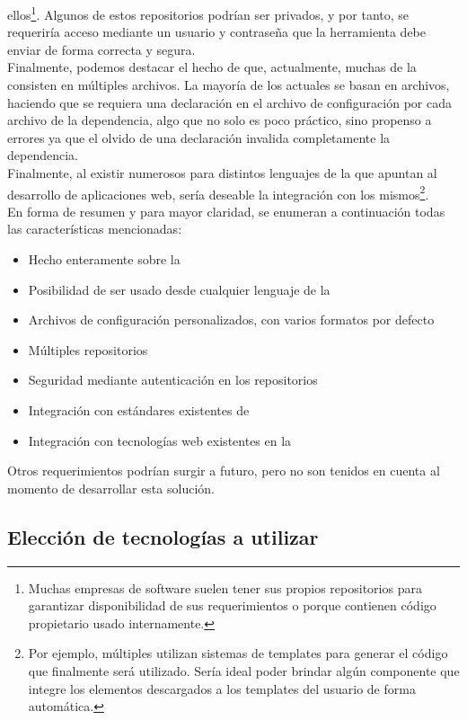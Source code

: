 ellos\footnote{
	Muchas empresas de software suelen tener sus propios repositorios para
	garantizar disponibilidad de sus requerimientos o porque contienen código
	propietario usado internamente.
}. Algunos de estos repositorios podrían ser privados, y por tanto, se requeriría
acceso mediante un usuario y contraseña que la herramienta debe enviar de forma
correcta y segura.\\
Finalmente, podemos destacar el hecho de que, actualmente, muchas \dependencies
de la \viewtier consisten en múltiples archivos. La mayoría de los \depmgrs actuales
se basan en archivos, haciendo que se requiera una declaración en el archivo de
configuración por cada archivo de la dependencia, algo que no solo es poco práctico,
sino propenso a errores ya que el olvido de una declaración invalida completamente
la dependencia.\\
Finalmente, al existir numerosos \frameworks para distintos lenguajes de la \jvm
que apuntan al desarrollo de aplicaciones web, sería deseable la integración con los
mismos\footnote{
	Por ejemplo, múltiples \frameworks utilizan sistemas de templates para generar el
	código \html que finalmente será utilizado. Sería ideal poder brindar algún
	componente que integre los elementos descargados a los templates del usuario
	de forma automática.
}.\\
En forma de resumen y para mayor claridad, se enumeran a continuación todas las
características mencionadas:
\begin{itemize}
	\setlength{\itemsep}{1pt}
	\setlength{\parskip}{0pt}
	\setlength{\parsep}{0pt}
	\item Hecho enteramente sobre la \jvm
	\item Posibilidad de ser usado desde cualquier lenguaje de la \jvm
	\item Archivos de configuración personalizados, con varios formatos por defecto
	\item Múltiples repositorios
	\item Seguridad mediante autenticación en los repositorios
	\item Integración con estándares existentes de \depmgrs
	\item Integración con tecnologías web existentes en la \jvm
\end{itemize}
Otros requerimientos podrían surgir a futuro, pero no son tenidos en cuenta al
momento de desarrollar esta solución.

\subsection{Elección de tecnologías a utilizar}

